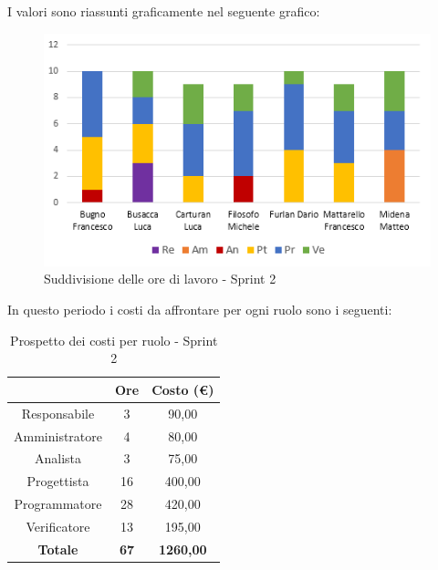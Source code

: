 I valori sono riassunti graficamente nel seguente grafico:

\begin{figure}[H]
  \centering
  \includegraphics[scale=1.0]{immagini/2Sprint_oreLavoro.png}
  \caption{Suddivisione delle ore di lavoro - Sprint 2}
\end{figure}

\pagebreak
In questo periodo i costi da affrontare per ogni ruolo sono i seguenti:

\begin{table}[H]
  \centering
  \renewcommand{\arraystretch}{1.8}
  \begin{tabular}{c|c|c}
    \rowcolor[HTML]{125E28}
    \multicolumn{1}{c}{\color[HTML]{FFFFFF}\textbf{Ruolo}}
                    & \multicolumn{1}{c}{\color[HTML]{FFFFFF}\textbf{Ore}}
                    & \multicolumn{1}{c}{\color[HTML]{FFFFFF}\textbf{Costo (€)}}                    \\
    \hline
    Responsabile    & 3                                                          & 90,00            \\
    Amministratore  & 4                                                          & 80,00            \\
    Analista        & 3                                                          & 75,00            \\
    Progettista     & 16                                                         & 400,00           \\
    Programmatore   & 28                                                         & 420,00           \\
    Verificatore    & 13                                                         & 195,00           \\
    \textbf{Totale} & \textbf{67}                                                & \textbf{1260,00}
  \end{tabular}
  \caption{Prospetto dei costi per ruolo - Sprint 2}
\end{table}

